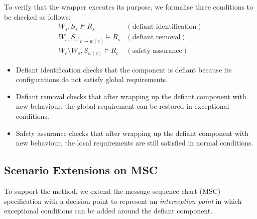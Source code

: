 To verify that the wrapper executes its purpose, we formalise three conditions to be checked as follows:
\[
\begin{array}{ll}
W_s, S_s \not \models R_s & (\mbox{defiant identification})\\
W_s, S_s |_{c\rightarrow w(c)} \models R_s & (\mbox{defiant removal}) \\
W_c \setminus W_s, S_{w(c)} \models R_c & (\mbox{safety assurance})
\end{array}
\]
\begin{itemize}
\item Defiant identification checks that the component is defiant because its configurations do not satisfy global requirements.

\item Defiant removal checks that after wrapping up the defiant component with new behaviour, the global requirement can be restored in exceptional conditions.

\item Safety assurance checks that after wrapping up the defiant component with new behaviour, the local requirements are still satisfied in normal conditions. 
\end{itemize}

\subsection{Scenario Extensions on MSC}
To support the method, we extend the message sequence chart (MSC) specification with a decision point  to represent an \textit{interception point} in which exceptional conditions can be added around the defiant component. 

